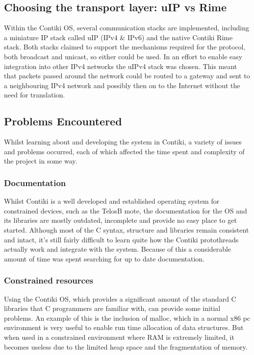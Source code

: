 
\subsection{Choosing the transport layer: uIP vs Rime} %
\label{sub:ip4_vs_ipv6_vs_rime}
Within the Contiki OS, several communication stacks are implemented, including a miniature IP stack called uIP (IPv4 \& IPv6) and the native Contiki Rime stack. Both stacks claimed to support the mechanisms required for the protocol, both broadcast and unicast, so either could be used. In an effort to enable easy integration into other IPv4 networks the uIPv4 stack was chosen. This meant that packets passed around the network could be routed to a gateway and sent to a neighbouring IPv4 network and possibly then on to the Internet without the need for translation. 

\subsection{Problems Encountered} %
\label{sub:problems_encountered}
Whilst learning about and developing the system in Contiki, a variety of issues and problems occurred, each of which affected the time spent and complexity of the project in some way.
\subsubsection{Documentation} %
\label{ssub:documentation}
Whilst Contiki is a well developed and established operating system for constrained devices, such as the TelosB mote, the documentation for the OS and its libraries are mostly outdated, incomplete and provide no easy place to get started. Although most of the C syntax, structure and libraries remain consistent and intact, it's still fairly difficult to learn quite how the Contiki protothreads actually work and integrate with the system. Because of this a considerable amount of time was spent searching for up to date documentation.

\subsubsection{Constrained resources} %
\label{ssub:constrained_resources}
Using the Contiki OS, which provides a significant amount of the standard C libraries that C programmers are familiar with, can provide some initial problems. An example of this is the inclusion of malloc, which in a normal x86 pc environment is very useful to enable run time allocation of data structures. But when used in a constrained environment where RAM is extremely limited, it becomes useless due to the limited heap space and the fragmentation of memory. 

